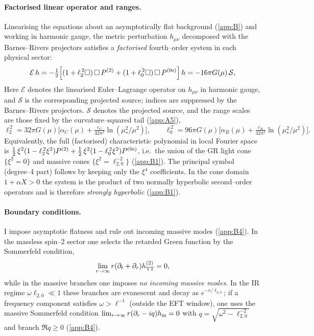 \documentclass{iopjournal}
\begin{document}
\paragraph{Factorised linear operator and ranges.}
Linearising the equations about an asymptotically flat background (\cref{app:B}) and working in harmonic gauge, the metric perturbation $h_{\mu\nu}$ decomposed with the Barnes–Rivers projectors satisfies a \emph{factorised} fourth–order system in each physical sector:
\begin{equation}
\mathcal{E}\,h
=-\tfrac12\Big[(1+\ell_2^{\,2}\Box)\,\Box\,P^{(2)}+(1+\ell_0^{\,2}\Box)\,\Box\,P^{(0{\rm s})}\Big]\,h
=-16\pi G(\mu)\,\mathcal S,
\label{eq:lin_factor}
\end{equation}
Here $\mathcal E$ denotes the linearised Euler–Lagrange operator on $h_{\mu\nu}$ in harmonic gauge, and $\mathcal S$ is the corresponding projected source; indices are suppressed by the Barnes–Rivers projectors.
 $\mathcal S$ denotes the projected source, and the range scales are those fixed by the curvature–squared tail (\cref{app:A5}),
\begin{equation}
\ell_2^{\,2}=32\pi G(\mu)\Big[\alpha_C(\mu)+\tfrac{c_C}{32\pi^2}\ln(\mu_*^2/\mu^2)\Big],\qquad
\ell_0^{\,2}=96\pi G(\mu)\Big[\alpha_R(\mu)+\tfrac{c_R}{32\pi^2}\ln(\mu_*^2/\mu^2)\Big].
\label{eq:lin_ranges}
\end{equation}
Equivalently, the full (factorised) characteristic polynomial in local Fourier space is
$\tfrac12\,\xi^2(1-\ell_2^{\,2}\xi^2)P^{(2)}+\tfrac12\,\xi^2(1-\ell_0^{\,2}\xi^2)P^{(0{\rm s})}$, i.e.\ the union of the GR light cone $\{\xi^2=0\}$ and massive cones $\{\xi^2=\ell_{2,0}^{-2}\}$ (\cref{app:B1}). The principal symbol (degree–4 part) follows by keeping only the $\xi^4$ coefficients. In the cone domain $1+\alpha X>0$ the system is the product of two normally hyperbolic second–order operators and is therefore \emph{strongly hyperbolic} (\cref{app:B1}).

\paragraph{Boundary conditions.}
I impose asymptotic flatness and rule out incoming massive modes (\cref{app:B4}). In the massless spin–2 sector one selects the retarded Green function by the Sommerfeld condition,
\begin{equation}
\lim_{r\to\infty} r(\partial_t+\partial_r)h^{(2)}_{\rm TT}=0,
\label{eq:lin_bc_massless}
\end{equation}
while in the massive branches one imposes \emph{no incoming massive modes}. In the IR regime $\omega\ell_{2,0}\ll1$ these branches are evanescent and decay as $e^{-r/\ell_{2,0}}$; if a frequency component satisfies $\omega>\ell^{-1}$ (outside the EFT window), one uses the massive Sommerfeld condition $\lim_{r\to\infty}r(\partial_r-i q)h_{\rm m}=0$ with $q=\sqrt{\omega^2-\ell_{2,0}^{-2}}$ and branch $\Re q\ge0$ (\cref{app:B4}).
\end{document}
